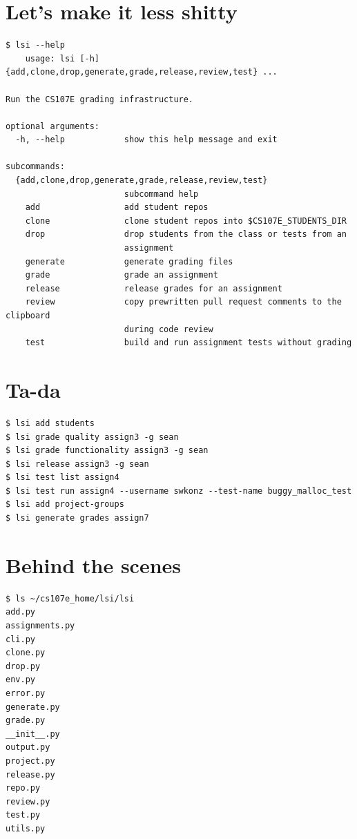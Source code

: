\documentclass{article}
\begin{document}
\newpage

\section*{Let's make it less shitty}
\vspace{2ex}
\begin{verbatim}
$ lsi --help 
    usage: lsi [-h] {add,clone,drop,generate,grade,release,review,test} ...

Run the CS107E grading infrastructure.

optional arguments:
  -h, --help            show this help message and exit

subcommands:
  {add,clone,drop,generate,grade,release,review,test}
                        subcommand help
    add                 add student repos
    clone               clone student repos into $CS107E_STUDENTS_DIR
    drop                drop students from the class or tests from an
                        assignment
    generate            generate grading files
    grade               grade an assignment
    release             release grades for an assignment
    review              copy prewritten pull request comments to the clipboard
                        during code review
    test                build and run assignment tests without grading
\end{verbatim}

\newpage

\section*{Ta-da}
\vspace{2ex}
\begin{verbatim}
$ lsi add students
$ lsi grade quality assign3 -g sean
$ lsi grade functionality assign3 -g sean
$ lsi release assign3 -g sean
$ lsi test list assign4
$ lsi test run assign4 --username swkonz --test-name buggy_malloc_test
$ lsi add project-groups
$ lsi generate grades assign7
\end{verbatim}

\newpage

\section*{Behind the scenes}
\vspace{2ex}
\begin{verbatim}
$ ls ~/cs107e_home/lsi/lsi
add.py
assignments.py
cli.py
clone.py
drop.py
env.py
error.py
generate.py
grade.py
__init__.py
output.py
project.py
release.py
repo.py
review.py
test.py
utils.py
\end{verbatim}
\end{document}
